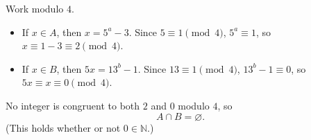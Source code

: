 Work modulo $4$.
\begin{itemize}
\item If $x\in A$, then $x=5^a-3$. Since $5\equiv1\pmod4$, $5^a\equiv1$, so $x\equiv1-3\equiv2\pmod4$.
\item If $x\in B$, then $5x=13^b-1$. Since $13\equiv1\pmod4$, $13^b-1\equiv0$, so $5x\equiv x\equiv0\pmod4$.
\end{itemize}
No integer is congruent to both $2$ and $0$ modulo $4$, so
\[A\cap B=\boxed{\varnothing}.\]
(This holds whether or not $0\in\mathbb N$.)
